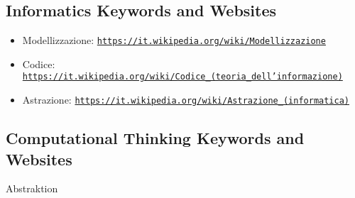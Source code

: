 \documentclass[a4paper,11pt]{report}
\newcommand{\BrochureUrlText}[1]{\texttt{#1}}
\begin{document}
\subsection*{Informatics Keywords and Websites}

\begin{itemize}
  \item Modellizzazione: \href{https://it.wikipedia.org/wiki/Modellizzazione}{\BrochureUrlText{https://it.wikipedia.org/wiki/Modellizzazione}}
  \item Codice: \href{https://it.wikipedia.org/wiki/Codice_(teoria_dell\%27informazione)}{\BrochureUrlText{https://it.wikipedia.org/wiki/Codice\_(teoria\_dell'informazione)}}
  \item Astrazione: \href{https://it.wikipedia.org/wiki/Astrazione_(informatica)}{\BrochureUrlText{https://it.wikipedia.org/wiki/Astrazione\_(informatica)}}
\end{itemize}


\subsection*{Computational Thinking Keywords and Websites}

Abstraktion
\end{document}
